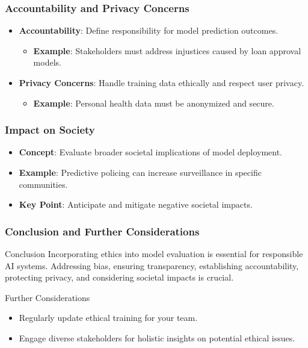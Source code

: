 \documentclass[aspectratio=169]{beamer}
\begin{document}
\begin{frame}[fragile]
    \frametitle{Accountability and Privacy Concerns}
    \begin{itemize}
        \item \textbf{Accountability}: Define responsibility for model prediction outcomes.
        \begin{itemize}
            \item \textbf{Example}: Stakeholders must address injustices caused by loan approval models.
        \end{itemize}
        \item \textbf{Privacy Concerns}: Handle training data ethically and respect user privacy.
        \begin{itemize}
            \item \textbf{Example}: Personal health data must be anonymized and secure.
        \end{itemize}
    \end{itemize}
\end{frame}

\begin{frame}[fragile]
    \frametitle{Impact on Society}
    \begin{itemize}
        \item \textbf{Concept}: Evaluate broader societal implications of model deployment.
        \item \textbf{Example}: Predictive policing can increase surveillance in specific communities.
        \item \textbf{Key Point}: Anticipate and mitigate negative societal impacts.
    \end{itemize}
\end{frame}

\begin{frame}[fragile]
    \frametitle{Conclusion and Further Considerations}
    \begin{block}{Conclusion}
        Incorporating ethics into model evaluation is essential for responsible AI systems. Addressing bias, ensuring transparency, establishing accountability, protecting privacy, and considering societal impacts is crucial.
    \end{block}
    \begin{block}{Further Considerations}
        \begin{itemize}
            \item Regularly update ethical training for your team.
            \item Engage diverse stakeholders for holistic insights on potential ethical issues.
        \end{itemize}
    \end{block}
\end{frame}
\end{document}
